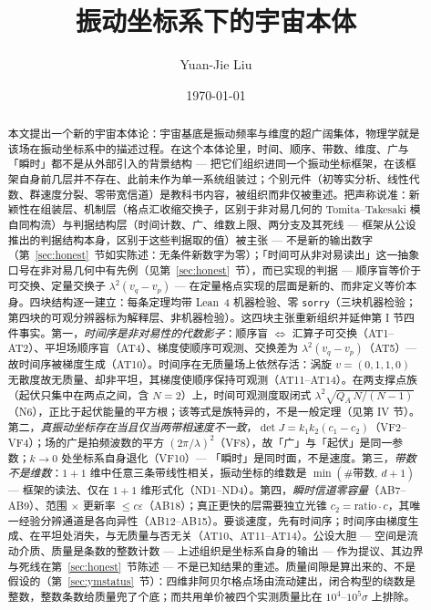 \documentclass[aps,prd,preprint,superscriptaddress,amsmath,amssymb]{revtex4-2}
\begin{document}
\title{振动坐标系下的宇宙本体}

\author{Yuan-Jie Liu}

\date{\today}

\begin{abstract}
本文提出一个新的宇宙本体论：宇宙基底是振动频率与维度的超广阔集体，物理学就是该场在振动坐标系中的描述过程。在这个本体论里，时间、顺序、带数、维度、广与「瞬时」都不是从外部引入的背景结构 --- 把它们组织进同一个振动坐标框架，在该框架自身前几层并不存在、此前未作为单一系统组装过；个别元件（初等实分析、线性代数、群速度分裂、零带宽信道）是教科书内容，被组织而非仅被重述。把声称说准：新颖性在组装层、机制层（格点汇收缩交换子，区别于非对易几何的 Tomita--Takesaki 模自同构流）与判据结构层（时间计数、广、维数上限、两分支及其死线 --- 框架从公设推出的判据结构本身，区别于这些判据取的值）被主张 --- 不是新的输出数字（第~\ref{sec:honest}~节如实陈述：无条件新数字为零）；「时间可从非对易读出」这一抽象口号在非对易几何中有先例（见第~\ref{sec:honest}~节），而已实现的判据 --- 顺序盲等价于可交换、定量交换子 $\lambda^2(v_q-v_p)$ --- 在定量格点实现的层面是新的、而非定义等价本身。四块结构逐一建立：每条定理均带 Lean~4 机器检验、零 \texttt{sorry}（三块机器检验；第四块的可观分辨器标为解释层、非机器检验）。这四块主张重新组织并延伸第 I 节四件事实。第一，\emph{时间序是非对易性的代数影子}：顺序盲 $\iff$ 汇算子可交换（AT1--AT2）、平坦场顺序盲（AT4）、梯度使顺序可观测、交换差为 $\lambda^2(v_q-v_p)$（AT5）--- 故时间序被梯度生成（AT10）。时间序在无质量场上依然存活：涡旋 $v=(0,1,1,0)$ 无散度故无质量、却非平坦，其梯度使顺序保持可观测（AT11--AT14）。在两支撑点族（起伏只集中在两点之间，含 $N=2$）上，时间可观测度取闭式 $\lambda^2\sqrt{Q_A\,N/(N-1)}$（N6），正比于起伏能量的平方根；该等式是族特异的，不是一般定理（见第 IV 节）。第二，\emph{真振动坐标存在当且仅当两带相速度不一致}，$\det J=k_1k_2(c_1-c_2)$（VF2--VF4）；场的广是拍频波数的平方 $(2\pi/\lambda)^2$（VF8），故「广」与「起伏」是同一参数；$k\to0$ 处坐标系自身退化（VF10）--- 「瞬时」是同时面，不是速度。第三，\emph{带数不是维数}：$1+1$ 维中任意三条带线性相关，振动坐标的维数是 $\min(\#\text{带数},\,d+1)$ --- 框架的读法、仅在 $1+1$ 维形式化（ND1--ND4）。第四，\emph{瞬时信道零容量}（AB7--AB9）、范围 $\times$ 更新率 $\le c\varepsilon$（AB18）；真正更快的层需要独立光锥 $c_2=\mathrm{ratio}\cdot c$，其唯一经验分辨通道是各向异性（AB12--AB15）。要谈速度，先有时间序；时间序由梯度生成、在平坦处消失，与无质量与否无关（AT10、AT11--AT14）。公设大胆 --- 空间是流动介质、质量是条数的整数计数\cite{liu2026cosmic,liu2026yangmills} --- 上述组织是坐标系自身的输出 --- 作为提议、其边界与死线在第~\ref{sec:honest}~节陈述 --- 不是已知结果的重述。质量间隙是算出来的、不是假设的（第~\ref{sec:ymstatus}~节）：四维非阿贝尔格点场由流动建出，闭合构型的绕数是整数，整数条数给质量兜了个底；而共用单价被四个实测质量比在 $10^4$--$10^5\sigma$ 上排除。
\end{abstract}
\end{document}
